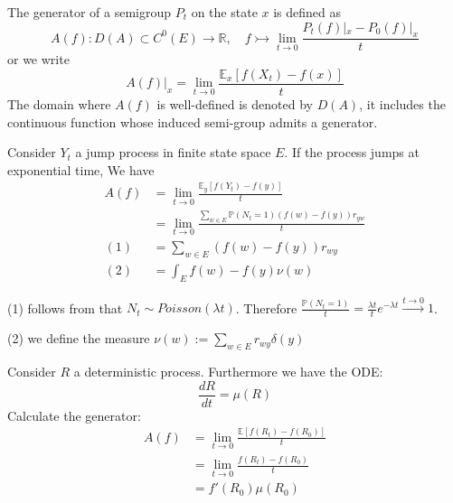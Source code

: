 \begin{definition}
The generator of a semigroup $P_t$ on the state $x$ is defined as
\begin{equation*}
	A(f): D(A) \subset C^0(E) \rightarrow \mathbb{R},\quad f \rightarrowtail \lim_{t \rightarrow 0} \frac{P_t(f)|_x - P_0(f)|_x}{t}
\end{equation*}
or we write
\begin{equation*}
	A(f)|_x = \lim_{t \rightarrow 0} \frac{\mathbb{E}_x[f(X_t) - f(x)]}{t}
\end{equation*}
The domain where $A(f)$ is well-defined is denoted by $D(A)$, it includes the continuous function whose induced semi-group admits a generator.
\end{definition}

\begin{example}
Consider $Y_t$ a jump process in finite state space $E$. If the process jumps at exponential time, We have
\begin{align*}
	A(f) &= \lim_{t \rightarrow 0} \frac{\mathbb{E}_y[f(Y_t) - f(y)]}{t}\\
	&= \lim_{t \rightarrow 0} \frac{\sum_{w \in E} \mathbb{P}(N_t = 1)(f(w) - f(y)) r_{yw} }{t}\\
	(1)&= \sum_{w \in E}(f(w) - f(y))r_{wy} \\
	(2)&= \int_E f(w) - f(y) \nu(w)
\end{align*}

(1) follows from that $N_t \sim Poisson(\lambda t)$. Therefore $\frac{\mathbb{P}(N_t = 1)}{t} = \frac{\lambda t }{t} e^{-\lambda t} \overset{ t \rightarrow 0}{\rightarrow}  1 $.\par
(2) we define the measure $\nu(w):= \sum_{w \in E} r_{wy} \delta(y)$
\end{example}

\begin{example}
Consider $R$ a deterministic process. Furthermore we have the ODE:
\begin{equation*}
	\frac{dR}{dt} = \mu(R)
\end{equation*}
Calculate the generator:
\begin{align*}
	A(f) &= \lim_{t \rightarrow 0} \frac{\mathbb{E}[f(R_t) - f(R_0)]}{t}\\
	&= \lim_{t \rightarrow 0} \frac{f(R_t) - f(R_0)}{t}\\
	&= f'(R_0) \mu(R_0)
\end{align*}
\end{example}

